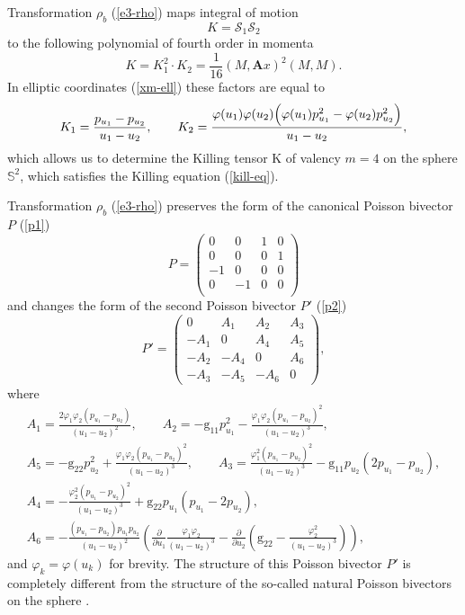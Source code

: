 \documentclass[10pt,a4paper]{amsart}
\numberwithin{equation}{section}
\begin{document}
Transformation $\rho_b$ (\ref{e3-rho}) maps integral of motion
\[K=\mathcal{S}_1 \mathcal{S}_2\]
to the following polynomial of fourth order in momenta
\[K =K_1^2\cdot K_2=\dfrac{1}{16}(M,\mathbf Ax)^2(M,M) .\]
In elliptic coordinates (\ref{xm-ell}) these factors are equal to
\begin{equation}\label{K}
 K_1=\frac{p_{u_1}-p_{u_2}}{u_1-u_2} , \qquad K_2=\frac{\varphi(u_1)\varphi(u_2)\Bigl(\varphi(u_1)p_{u_1}^2-\varphi(u_2)p_{u_2}^2\Bigr)}{u_1-u_2} ,
\end{equation}
which allows us to determine the Killing tensor $\mathrm K$ of valency $m=4$ on the sphere $\mathbb S^2$, which satisfies the Killing equation (\ref{kill-eq}).

Transformation $\rho_b$ (\ref{e3-rho}) preserves the form of the canonical Poisson bivector $P$ (\ref{p1})
\begin{equation}\label{pp1}
P=\left(
 \begin{array}{cccc}
 0 & 0 & 1 & 0 \\
 0 & 0 & 0 & 1 \\
 -1 & 0 & 0 & 0 \\
 0 & -1 & 0 & 0 \\
 \end{array}
 \right)
\end{equation}
and changes the form of the second Poisson bivector $P'$ (\ref{p2})
\begin{equation}\label{pp2}
P'=\left(
 \begin{matrix}
 0 & A_1 & A_2 & A_3 \\
 -A_1 & 0 & A_4 & A_5 \\
 -A_2 & -A_4 & 0 & A_6 \\
 -A_3 & -A_5 & -A_6 & 0
 \end{matrix}
 \right),
\end{equation}
where
\begin{gather*}
A_1=\frac{2\varphi_1\varphi_2(p_{u_1} - p_{u_2})}{(u_1 - u_2)^2} ,\qquad  A_2=-\mathrm g_{11}p_{u_1}^2 -\frac{\varphi_1\varphi_2(p_{u_1} - p_{u_2})^2}{(u_1 - u_2)^3} ,  \\
A_5=-\mathrm g_{22}p_{u_2}^2+\frac{\varphi_1\varphi_2(p_{u_1} - p_{u_2})^2}{(u_1 - u_2)^3} ,
\qquad
A_3=\frac{\varphi_1^2(p_{u_1} - p_{u_2})^2}{(u_1 - u_2)^3}-\mathrm g_{11}p_{u_2}(2p_{u_1} - p_{u_2}) ,\\
 A_4=-\frac{\varphi_2^2(p_{u_1} - p_{u_2})^2}{(u_1 - u_2)^3}+\mathrm g_{22}p_{u_1}(p_{u_1} - 2p_{u_2}),
 \\
A_6=-\frac{(p_{u_1} - p_{u_2})p_{u_1}p_{u_2}}{(u_1 - u_2)^2}\left( \frac{\partial}{\partial u_1}\frac{\varphi_1\varphi_2}{(u_1-u_2)^3}-\frac{\partial}{\partial u_2} \left(\mathrm g_{22}-\frac{\varphi_2^2}{(u_1-u_2)^3}\right) \right) ,
\end{gather*}
and $\varphi_k=\varphi(u_k)$ for brevity. The structure of this Poisson bivector $P'$ is completely different from the structure of the so-called natural Poisson bivectors on the sphere \cite{ts11,vt09}.
\end{document}

